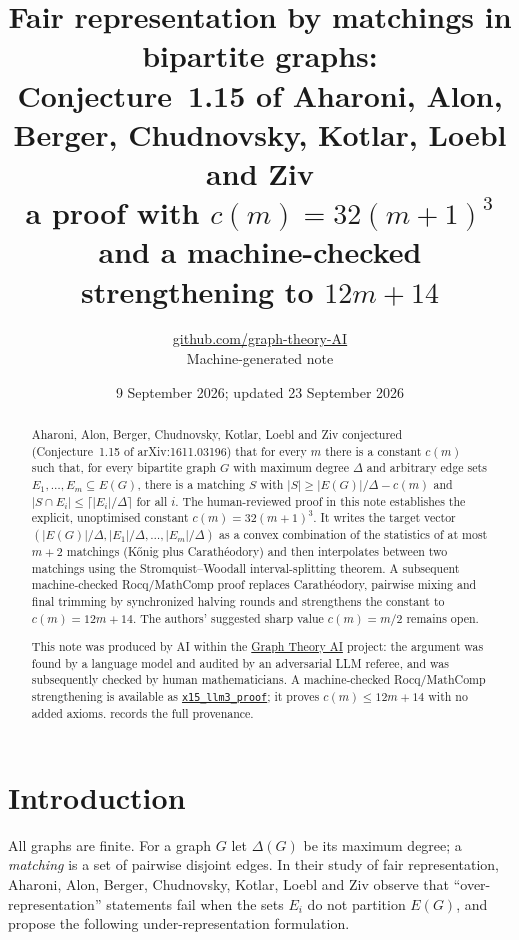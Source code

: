 \documentclass[11pt,a4paper]{article}
\title{Fair representation by matchings in bipartite graphs:\\ Conjecture~1.15 of Aharoni, Alon, Berger, Chudnovsky, Kotlar, Loebl and Ziv\\ a proof with $c(m)=32(m+1)^3$ and a machine-checked strengthening to $12m+14$}
\author{\href{https://github.com/graph-theory-AI}{github.com/graph-theory-AI}\\[2pt] \normalsize Machine-generated note}
\date{9 September 2026; updated 23 September 2026}
\theoremstyle{plain}
\theoremstyle{definition}
\theoremstyle{remark}
\begin{document}
\maketitle


\begin{abstract}
Aharoni, Alon, Berger, Chudnovsky, Kotlar, Loebl and Ziv conjectured (Conjecture~1.15 of arXiv:1611.03196) that for every $m$ there is a constant $c(m)$ such that, for every bipartite graph $G$ with maximum degree $\Delta$ and arbitrary edge sets $E_1,\dots,E_m\subseteq E(G)$, there is a matching $S$ with $|S|\ge|E(G)|/\Delta-c(m)$ and $|S\cap E_i|\le\lceil|E_i|/\Delta\rceil$ for all $i$. The human-reviewed proof in this note establishes the explicit, unoptimised constant $c(m)=32(m+1)^3$. It writes the target vector $(|E(G)|/\Delta,|E_1|/\Delta,\dots,|E_m|/\Delta)$ as a convex combination of the statistics of at most $m+2$ matchings (Kőnig plus Carathéodory) and then interpolates between two matchings using the Stromquist--Woodall interval-splitting theorem. A subsequent machine-checked Rocq/MathComp proof replaces Carathéodory, pairwise mixing and final trimming by synchronized halving rounds and strengthens the constant to $c(m)=12m+14$. The authors' suggested sharp value $c(m)=m/2$ remains open.

\medskip\noindent\small
This note was produced by AI within the \href{https://github.com/graph-theory-AI/Graph-Theory-LLM-Proofs}{Graph Theory AI} project:
the argument was found by a language model and audited by an adversarial LLM
referee, and was subsequently checked by human mathematicians.
A machine-checked Rocq/MathComp strengthening is available as
\href{https://github.com/graph-theory-AI/graph-theory-rocq/blob/main/packing-theory/theories/foundations/fair_matching.v}{\texttt{x15\_llm3\_proof}}; it proves $c(m)\le12m+14$ with no added axioms.
 records the full provenance.

\end{abstract}

\section{Introduction}\label{sec:intro}

All graphs are finite. For a graph $G$ let $\Delta(G)$ be its maximum degree; a \emph{matching} is a set of pairwise disjoint edges. In their study of fair representation, Aharoni, Alon, Berger, Chudnovsky, Kotlar, Loebl and Ziv \cite{AABCKLZ} observe that ``over-representation'' statements fail when the sets $E_i$ do not partition $E(G)$, and propose the following under-representation formulation.
\end{document}
